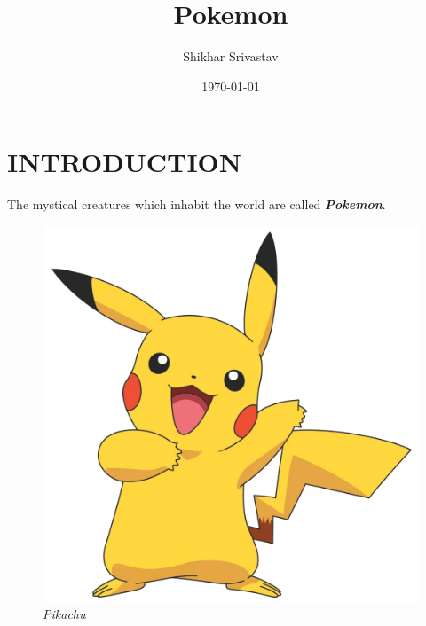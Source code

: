 \documentclass{article}
\begin{document}
\title{Pokemon}
\author{Shikhar Srivastav}
\date{\today}
\maketitle
\newpage
\tableofcontents
\newpage
{}
\section{INTRODUCTION}
The mystical creatures which inhabit the world are called \large \textbf{\textsl{Pokemon}}.
\begin{figure}[h]
\centering
\includegraphics[scale=1.5]{pikachu.png}
\caption{\textit{Pikachu}}
\label{Fig:Figure1}
\end{figure}
\end{document}
